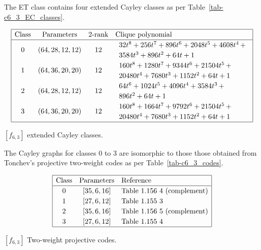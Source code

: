 The ET class contains four extended Cayley classes as per Table~\ref{tab-c6_3_EC_classes}.

\begin{table}[!bhpt] %
%
\small{}
\begin{align*}
\def\arraystretch{1.2}
\begin{array}{|cccl|}
\hline
\text{Class} &
\text{Parameters} &
\text{2-rank} &
\text{Clique polynomial}
\\
\hline
0 &
(64, 28, 12, 12) &
12 &
\begin{array}{l}
32t^{8} + 256t^{7} + 896t^{6} + 2048t^{5} + 4608t^{4}
\,+
\\
 3584t^{3} + 896t^{2} + 64t + 1
\end{array}
\\
1 &
(64, 36, 20, 20) &
12 &
\begin{array}{l}
160t^{8} + 1280t^{7} + 9344t^{6} + 21504t^{5}
\,+
\\
 20480t^{4} + 7680t^{3} + 1152t^{2} + 64t + 1
\end{array}
\\
2 &
(64, 28, 12, 12) &
12 &
\begin{array}{l}
64t^{6} + 1024t^{5} + 4096t^{4} + 3584t^{3}
\,+
\\
 896t^{2} + 64t + 1
\end{array}
\\
3 &
(64, 36, 20, 20) &
12 &
\begin{array}{l}
160t^{8} + 1664t^{7} + 9792t^{6} + 21504t^{5}
\,+
\\
 20480t^{4} + 7680t^{3} + 1152t^{2} + 64t + 1
\end{array}
\\
\hline
\end{array}
\end{align*}
%
\caption{$[f_{6,3}]$ extended Cayley classes.}
\label{tab-c6_3_EC_classes}
\end{table}

The Cayley graphs for classes 0 to 3 are isomorphic to those those obtained from
Tonchev's projective two-weight codes \cite{Ton07codes} as per Table~\ref{tab-c6_3_codes}.

\begin{table}[!bhpt] %
\small{
\begin{align*}
\def\arraystretch{1.2}
\begin{array}{|ccl|}
\hline
\text{Class} &
\text{Parameters} & \text{Reference}
\\
\hline
0 & [35,6,16] & \text{Table 1.156 4 (complement)}
\\
1 & [27,6,12] & \text{Table 1.155 3 }
\\
2 & [35,6,16] & \text{Table 1.156 5 (complement)}
\\
3 & [27,6,12] & \text{Table 1.155 4 }
\\
\hline
\end{array}
\end{align*}
}
\caption{$[f_{6,3}]$ Two-weight projective codes.}
\label{tab-c6_3_codes}
\end{table}

